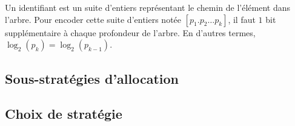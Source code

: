 Un identifiant \LSEQ est un suite d'entiers représentant le chemin de l'élément
dans l'arbre. Pour encoder cette suite d'entiers notée $[p_1.p_2\ldots p_k]$, il
faut $1$ bit supplémentaire à chaque profondeur de l'arbre. En d'autres termes,
$\log_2(p_k) = \log_2(p_{k-1})$.

\subsection{Sous-stratégies d'allocation}


\subsection{Choix de stratégie}

